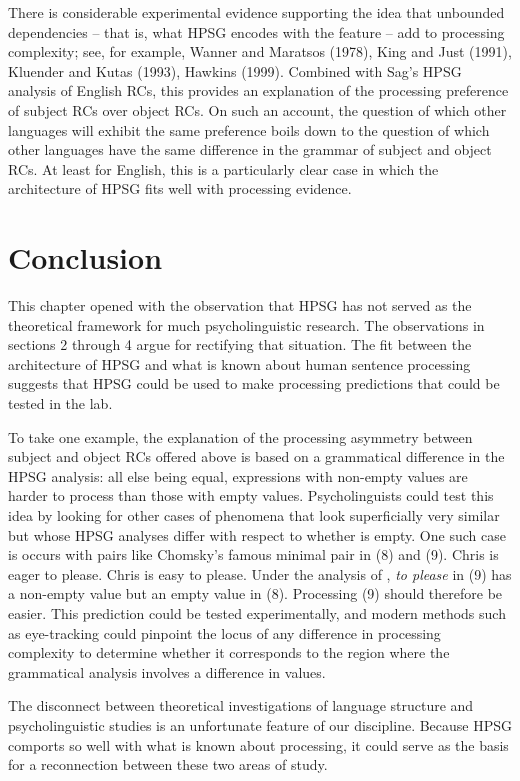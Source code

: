 \documentclass[a4paper]{article}
\begin{document}
There is considerable experimental evidence supporting the idea that unbounded dependencies -- that is, what HPSG encodes with the \slasch feature -- add to processing complexity; see, for example, Wanner and Maratsos (1978), King and Just (1991), Kluender and Kutas (1993), Hawkins (1999).  Combined with Sag's HPSG analysis of English RCs, this provides an explanation of the processing preference of subject RCs over object RCs.  On such an account, the question of which other languages will exhibit the same preference boils down to the question of which other languages have the same difference in the grammar of subject and object RCs.  At least for English, this is a particularly clear case in which the architecture of HPSG fits well with processing evidence.

\section{Conclusion}

This chapter opened with the observation that HPSG has not served as the theoretical framework for much psycholinguistic research.  The observations in sections 2 through 4 argue for rectifying that situation.  The fit between the architecture of HPSG and what is known about human sentence processing suggests that HPSG could be used to make processing predictions that could be tested in the lab.  

To take one example, the explanation of the processing asymmetry between subject and object RCs offered above is based on a grammatical difference in the HPSG analysis:  all else being equal, expressions with non-empty \slasch values are harder to process than those with empty \slasch values.  Psycholinguists could test this idea by looking for other cases of phenomena that look superficially very similar but whose HPSG analyses differ with respect to whether \slasch is empty.  One such case is occurs with pairs like Chomsky's famous minimal pair in (8) and (9).
\eal
\ex Chris is eager to please.
\ex Chris is easy to please.
\zl
Under the analysis of \citet{ps2}, {\it to please} in (9) has a non-empty \slasch value but an empty \slasch value in (8).  Processing (9) should therefore be easier.  This prediction could be tested experimentally, and modern methods such as eye-tracking could pinpoint the locus of any difference in processing complexity to determine whether it corresponds to the region where the grammatical analysis involves a difference in \slasch values.

The disconnect between theoretical investigations of language structure and psycholinguistic studies is an unfortunate feature of our discipline.  Because HPSG comports so well with what is known about processing, it could serve as the basis for a reconnection between these two areas of study.
\end{document}
